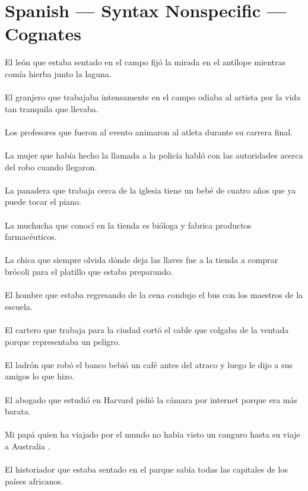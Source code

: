 \section{Spanish --- Syntax Nonspecific --- Cognates}
El león que estaba sentado en el campo fijó la mirada en el antílope mientras comía hierba junto la laguna.	\\	\\
El granjero que trabajaba intensamente en el campo odiaba al artista por la vida tan tranquila que llevaba.	\\	\\
Los profesores que fueron al evento animaron al atleta durante su carrera final.	\\	\\
La mujer que había hecho la llamada a la policía habló con las autoridades acerca del robo cuando llegaron.	\\	\\
La panadera que trabaja cerca de la iglesia tiene un bebé de cuatro años que ya puede tocar el piano.	\\	\\
La muchucha que conocí en la tienda es bióloga y fabrica productos farmacéuticos.	\\	\\
La chica que siempre olvida dónde deja las llaves fue a la tienda a comprar brócoli para el platillo que estaba preparando.	\\	\\
El hombre que estaba regresando de la cena condujo el bus con los maestros de la escuela.	\\	\\
El cartero que trabaja para la ciudad cortó el cable que colgaba de la ventada porque representaba un peligro.	\\	\\
El ladrón que robó el banco bebió un café antes del atraco y luego le dijo a sus amigos lo que hizo.	\\	\\
El abogado que estudió en Harvard pidió la cámara por internet porque era más barata.	\\	\\
Mi papá quien ha viajado por el mundo no había visto un canguro hasta su viaje a Australia .	\\	\\
El historiador que estaba sentado en el parque sabía todas las capitales de los países africanos.	\\	\\
